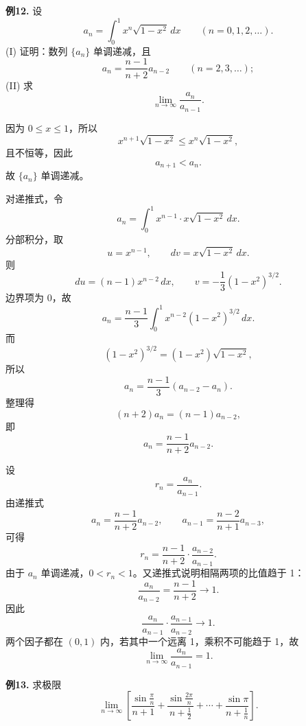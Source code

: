 \begin{problemblock}
\textbf{例12.} 设
\[
a_n=\int_0^1x^n\sqrt{1-x^2}\,dx\qquad(n=0,1,2,\dots).
\]
(I) 证明：数列 \(\{a_n\}\) 单调递减，且
\[
a_n=\frac{n-1}{n+2}a_{n-2}\qquad(n=2,3,\dots);
\]
(II) 求
\[
\lim_{n\to\infty}\frac{a_n}{a_{n-1}}.
\]
\end{problemblock}

\begin{solutionblock}

因为 \(0\le x\le1\)，所以
\[
x^{n+1}\sqrt{1-x^2}\le x^n\sqrt{1-x^2},
\]
且不恒等，因此
\[
a_{n+1}<a_n.
\]
故 \(\{a_n\}\) 单调递减。

对递推式，令
\[
a_n=\int_0^1x^{n-1}\cdot x\sqrt{1-x^2}\,dx.
\]
分部积分，取
\[
u=x^{n-1},\qquad dv=x\sqrt{1-x^2}\,dx.
\]
则
\[
du=(n-1)x^{n-2}\,dx,\qquad
v=-\frac13(1-x^2)^{3/2}.
\]
边界项为 0，故
\[
a_n=\frac{n-1}{3}\int_0^1x^{n-2}(1-x^2)^{3/2}\,dx.
\]
而
\[
(1-x^2)^{3/2}=(1-x^2)\sqrt{1-x^2},
\]
所以
\[
a_n=\frac{n-1}{3}\left(a_{n-2}-a_n\right).
\]
整理得
\[
(n+2)a_n=(n-1)a_{n-2},
\]
即
\[
a_n=\frac{n-1}{n+2}a_{n-2}.
\]

设
\[
r_n=\frac{a_n}{a_{n-1}}.
\]
由递推式
\[
a_n=\frac{n-1}{n+2}a_{n-2},\qquad
a_{n-1}=\frac{n-2}{n+1}a_{n-3},
\]
可得
\[
r_n=\frac{n-1}{n+2}\cdot\frac{a_{n-2}}{a_{n-1}}.
\]
由于 \(a_n\) 单调递减，\(0<r_n<1\)。又递推式说明相隔两项的比值趋于 1：
\[
\frac{a_n}{a_{n-2}}=\frac{n-1}{n+2}\to1.
\]
因此
\[
\frac{a_n}{a_{n-1}}\cdot\frac{a_{n-1}}{a_{n-2}}\to1.
\]
两个因子都在 \((0,1)\) 内，若其中一个远离 1，乘积不可能趋于 1，故
\[
\lim_{n\to\infty}\frac{a_n}{a_{n-1}}=1.
\]

\end{solutionblock}

\begin{problemblock}
\textbf{例13.} 求极限
\[
\lim_{n\to\infty}\left[
\frac{\sin\frac{\pi}{n}}{n+1}
+\frac{\sin\frac{2\pi}{n}}{n+\frac12}
+\cdots+
\frac{\sin\pi}{n+\frac1n}
\right].
\]
\end{problemblock}

